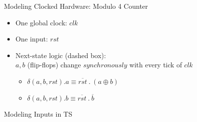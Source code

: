 \documentclass{beamer}
\begin{document}
\begin{frame}{Modeling Clocked Hardware: Modulo 4 Counter}
\begin{itemize}
\item One global clock: $clk$ \\

\item One input: $rst$

\item Next-state logic (dashed box): \\
$a, b$ (flip-flops) change $synchronously$ with every tick of $clk$
\begin{itemize}
\item $\delta(a, b, rst).a \equiv \overline{rst}~.~(a \oplus b)$
\item $\delta(a, b, rst).b \equiv \overline{rst}~.~\overline{b}$
\end{itemize}


\end{itemize}
\end{frame}

\begin{frame}{Modeling Inputs in TS}
\hfill
{} \\
\hfill 
{}
\end{frame}
\end{document}
